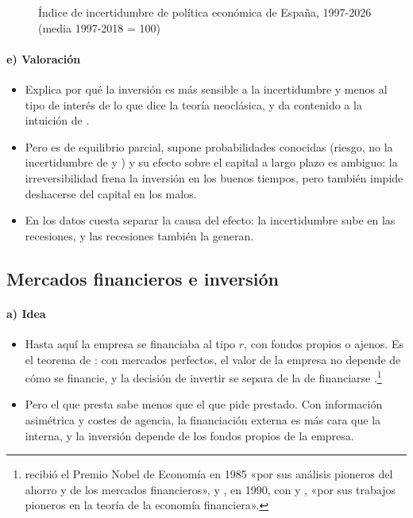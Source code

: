\documentclass[11pt]{article}
\begin{document}
\begin{figure}[H]
\centering
\caption{Índice de incertidumbre de política económica de España, 1997-2026 (media 1997-2018 = 100)}\label{fig:epu-espana}
\end{figure}

\paragraph{e) Valoración}

\begin{itemize}
\item Explica por qué la inversión es más sensible a la incertidumbre y menos al tipo de interés de lo que dice la teoría neoclásica, y da contenido a la intuición de .
\item Pero es de equilibrio parcial, supone probabilidades conocidas (riesgo, no la incertidumbre de  y ) y su efecto sobre el capital a largo plazo es ambiguo: la irreversibilidad frena la inversión en los buenos tiempos, pero también impide deshacerse del capital en los malos\nocite{AbelEberly1999Effects}.
\item En los datos cuesta separar la causa del efecto: la incertidumbre sube en las recesiones, y las recesiones también la generan.
\end{itemize}

\subsection{Mercados financieros e inversión}\label{sec:financieros}

\paragraph{a) Idea}

\begin{itemize}
\item Hasta aquí la empresa se financiaba al tipo $r$, con fondos propios o ajenos. Es el teorema de \textcite{ModiglianiMiller1958Cost}: con mercados perfectos, el valor de la empresa no depende de cómo se financie, y la decisión de invertir se separa de la de financiarse .\footnote{ recibió el Premio Nobel de Economía en 1985 «por sus análisis pioneros del ahorro y de los mercados financieros»\nocite{Nobel1985Modigliani}, y , en 1990, con  y , «por sus trabajos pioneros en la teoría de la economía financiera»\nocite{Nobel1990Markowitz}.}
\item Pero el que presta sabe menos que el que pide prestado. Con información asimétrica y costes de agencia, la financiación externa es más cara que la interna, y la inversión depende de los fondos propios de la empresa.
\end{itemize}
\end{document}
